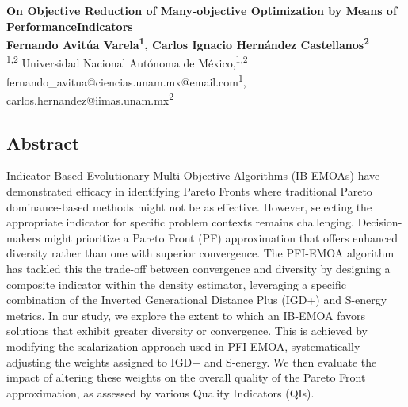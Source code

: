 \documentclass[a0,portrait]{a0poster}
\begin{document}
\begin{mdframed}[style=MyFrame]
\vspace{3cm}
\begin{minipage}[h]{0.98\linewidth}
\centering \huge \color{SteelBlue} \textbf{On Objective Reduction of Many-objective Optimization by Means of PerformanceIndicators} \color{Black}\\ %
\Large \textbf{Fernando Avitúa Varela\textsuperscript{1}, Carlos Ignacio Hernández Castellanos\textsuperscript{2}}\\ %
\normalsize \textsuperscript{1,2} Universidad Nacional Autónoma de México,\textsuperscript{1,2}\\ %
fernando\_avitua@ciencias.unam.mx@email.com\textsuperscript{1}, carlos.hernandez@iimas.unam.mx\textsuperscript{2}\\
\end{minipage}
\vspace{0.5cm} %


\begin{multicols}{2} %



\section{Abstract}
Indicator-Based Evolutionary Multi-Objective Algorithms (IB-EMOAs) have demonstrated efficacy in identifying Pareto Fronts where traditional Pareto dominance-based methods might not be as effective. However, selecting the appropriate indicator for specific problem contexts remains challenging. Decision-makers might prioritize a Pareto Front (PF) approximation that offers enhanced diversity rather than one with superior convergence. The PFI-EMOA algorithm has tackled this the trade-off between convergence and diversity by designing a composite indicator within the density estimator, leveraging a specific combination of the Inverted Generational Distance Plus (IGD+) and S-energy metrics. In our study, we explore the extent to which an IB-EMOA favors solutions that exhibit greater diversity or convergence. This is achieved by modifying the scalarization approach used in PFI-EMOA, systematically adjusting the weights assigned to IGD+ and S-energy. We then evaluate the impact of altering these weights on the overall quality of the Pareto Front approximation, as assessed by various Quality Indicators (QIs).


\end{multicols}
\end{mdframed}
\end{document}
